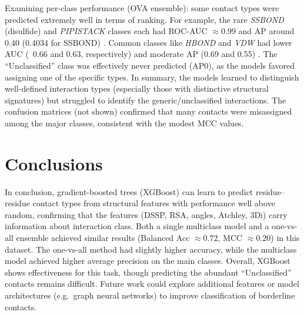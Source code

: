 \documentclass[10pt,twocolumn,letterpaper]{article}
\begin{document}
Examining per-class performance (OVA ensemble): some contact types were predicted extremely well in terms of ranking.  For example, the rare \textit{SSBOND} (disulfide) and \textit{PIPISTACK} classes each had ROC-AUC $\approx 0.99$ and AP around 0.40 (0.4034 for SSBOND)  .  Common classes like \textit{HBOND} and \textit{VDW} had lower AUC (~0.66 and 0.63, respectively) and moderate AP (0.69 and 0.55)  .  The “Unclassified” class was effectively never predicted (AP0), as the models favored assigning one of the specific types.  In summary, the models learned to distinguish well-defined interaction types (especially those with distinctive structural signatures) but struggled to identify the generic/unclassified interactions.  The confusion matrices (not shown) confirmed that many contacts were misassigned among the major classes, consistent with the modest MCC values.



\section{Conclusions}
In conclusion, gradient-boosted trees (XGBoost) can learn to predict residue–residue contact types from structural features with performance well above random, confirming that the features (DSSP, RSA, angles, Atchley, 3Di) carry information about interaction class.  Both a single multiclass model and a one-vs-all ensemble achieved similar results (Balanced Acc $\approx0.72$, MCC $\approx0.20$) in this dataset.  The one-vs-all method had slightly higher accuracy, while the multiclass model achieved higher average precision on the main classes.  Overall, XGBoost shows effectiveness for this task, though predicting the abundant “Unclassified” contacts remains difficult.  Future work could explore additional features or model architectures (e.g.\ graph neural networks) to improve classification of borderline contacts.


{\small


}
\end{document}
